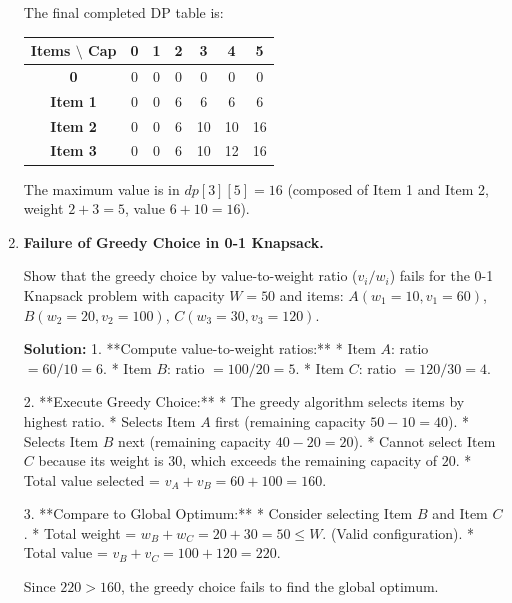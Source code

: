 \documentclass[12pt, a4paper]{book}
\begin{document}
\begin{problembox}
\begin{enumerate}[label=\textbf{E\arabic*.}]
        The final completed DP table is:
        \begin{center}
        \begin{tabular}{ccccccc}
          \toprule
          Items $\setminus$ Cap & \textbf{0} & \textbf{1} & \textbf{2} & \textbf{3} & \textbf{4} & \textbf{5} \\
          \midrule
          \textbf{0} & 0 & 0 & 0 & 0 & 0 & 0 \\
          \textbf{Item 1} & 0 & 0 & 6 & 6 & 6 & 6 \\
          \textbf{Item 2} & 0 & 0 & 6 & 10 & 10 & 16 \\
          \textbf{Item 3} & 0 & 0 & 6 & 10 & 12 & 16 \\
          \bottomrule
        \end{tabular}
        \end{center}
        The maximum value is in $dp[3][5] = 16$ (composed of Item 1 and Item 2, weight $2+3=5$, value $6+10=16$).
        
  \item \textbf{Failure of Greedy Choice in 0-1 Knapsack.}
  
        Show that the greedy choice by value-to-weight ratio ($v_i/w_i$) fails for the 0-1 Knapsack problem with capacity $W=50$ and items: $A (w_1=10, v_1=60)$, $B (w_2=20, v_2=100)$, $C (w_3=30, v_3=120)$.
        
        \textbf{Solution:}
        1. **Compute value-to-weight ratios:**
           * Item $A$: ratio $= 60/10 = 6$.
           * Item $B$: ratio $= 100/20 = 5$.
           * Item $C$: ratio $= 120/30 = 4$.
           
        2. **Execute Greedy Choice:**
           * The greedy algorithm selects items by highest ratio.
           * Selects Item $A$ first (remaining capacity $50 - 10 = 40$).
           * Selects Item $B$ next (remaining capacity $40 - 20 = 20$).
           * Cannot select Item $C$ because its weight is $30$, which exceeds the remaining capacity of $20$.
           * Total value selected = $v_A + v_B = 60 + 100 = 160$.
           
        3. **Compare to Global Optimum:**
           * Consider selecting Item $B$ and Item $C$.
           * Total weight = $w_B + w_C = 20 + 30 = 50 \le W$. (Valid configuration).
           * Total value = $v_B + v_C = 100 + 120 = 220$.
           
        Since $220 > 160$, the greedy choice fails to find the global optimum.
\end{enumerate}
\end{problembox}
\end{document}
